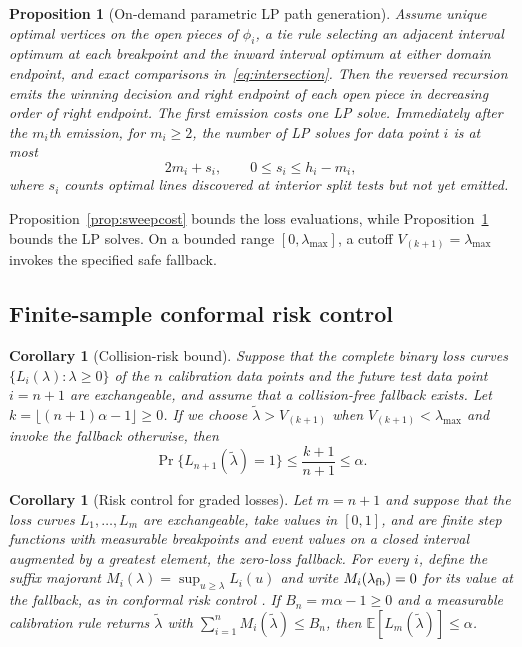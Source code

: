 \documentclass[a4paper,10pt]{article}
\theoremstyle{plain}
\newtheorem{proposition}[theorem]{Proposition}
\newtheorem{corollary}[theorem]{Corollary}
\theoremstyle{remark}
\begin{document}
\begin{proposition}[On-demand parametric LP path generation]\label{prop:lazy}
Assume unique optimal vertices on the open pieces of $\phi_i$, a tie rule selecting an adjacent interval optimum at each breakpoint and the inward interval optimum at either domain endpoint, and exact comparisons in~\eqref{eq:intersection}. Then the reversed recursion emits the winning decision and right endpoint of each open piece in decreasing order of right endpoint. The first emission costs one LP solve. Immediately after the $m_i$th emission, for $m_i\ge2$, the number of LP solves for data point $i$ is at most
\begin{equation}\label{eq:lazy-bound}
 2m_i+s_i,\qquad 0\le s_i\le h_i-m_i,
\end{equation}
where $s_i$ counts optimal lines discovered at interior split tests but not yet emitted.
\end{proposition}

Proposition~\ref{prop:sweepcost} bounds the loss evaluations, while Proposition~\ref{prop:lazy} bounds the LP solves. On a bounded range $[0,\lambda_{\max}]$, a cutoff $V_{(k+1)}=\lambda_{\max}$ invokes the specified safe fallback.

\subsection{Finite-sample conformal risk control}\label{sec:risk}

\begin{corollary}[Collision-risk bound]\label{cor:risk}
Suppose that the complete binary loss curves $\{L_i(\lambda):\lambda\ge0\}$ of the $n$ calibration data points and the future test data point $i=n+1$ are exchangeable, and assume that a collision-free fallback exists. Let $k=\lfloor(n+1)\alpha-1\rfloor\ge0$. If we choose $\widetilde\lambda>V_{(k+1)}$ when $V_{(k+1)}<\lambda_{\max}$ and invoke the fallback otherwise, then
\begin{equation}\label{eq:risk}
 \Pr\bigl\{L_{n+1}(\widetilde\lambda)=1\bigr\}\le\frac{k+1}{n+1}\le\alpha.
\end{equation}
\end{corollary}

\begin{corollary}[Risk control for graded losses]\label{cor:graded}
Let $m=n+1$ and suppose that the loss curves $L_1,\ldots,L_m$ are exchangeable, take values in $[0,1]$, and are finite step functions with measurable breakpoints and event values on a closed interval augmented by a greatest element, the zero-loss fallback. For every $i$, define the suffix majorant $M_i(\lambda)=\sup_{u\ge\lambda}L_i(u)$ and write $M_i(\lambda_{\rm fb})=0$ for its value at the fallback, as in conformal risk control \cite[Corollary~1]{crc}. If $B_n=m\alpha-1\ge0$ and a measurable calibration rule returns $\widetilde\lambda$ with $\sum_{i=1}^n M_i(\widetilde\lambda)\le B_n$, then $\mathbb E[L_m(\widetilde\lambda)]\le\alpha$.
\end{corollary}
\end{document}
